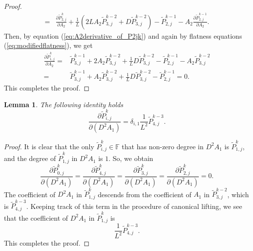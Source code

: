 \documentclass[12pt]{amsart}
\newtheorem{lem}[prop]{Lemma}
\numberwithin{equation}{section}
\begin{document}
\begin{proof}
\begin{equation}
\begin{aligned}
=&\frac{\partial \widetilde{P}_{2,j}^k}{\partial A_2}+\frac{1}{L}\left(2LA_2\widetilde{P}_{3,j}^{k-2}+D\widetilde{P}_{3,j}^{k-2}\right)-\widetilde{P}_{2,j}^{k-1}-A_2\frac{\partial \widetilde{P}_{2,j}^{k-1}}{\partial A_2}.
\end{aligned}
\end{equation}
Then, by equation (\ref{eq:A2derivative_of_P2jk}) and again by flatness equations (\ref{eq:modifiedflatness}), we get
\begin{equation}
\begin{aligned}
\frac{\partial \widetilde{P}_{1,j}^k}{\partial A_2}
=&\widetilde{P}_{3,j}^{k-1}+2A_2\widetilde{P}_{3,j}^{k-2}+\frac{1}{L}D\widetilde{P}_{3,j}^{k-2}-\widetilde{P}_{2,j}^{k-1}-A_2\widetilde{P}_{3,j}^{k-2}\\
=&\widetilde{P}_{3,j}^{k-1}+A_2\widetilde{P}_{3,j}^{k-2}+\frac{1}{L}D\widetilde{P}_{3,j}^{k-2}-\widetilde{P}_{2,j}^{k-1}=0.
\end{aligned}
\end{equation}
This completes the proof.
\end{proof}
 
\begin{lem}\label{lem:derivativeof_Pijk_wrtDA1}
The following identity holds
\begin{equation*}
\frac{\partial\widetilde{P}_{i,j}^k}{\partial{(D^2A_1)}}=\delta_{i,1}\frac{1}{L^2}\widetilde{P}_{{4},j}^{k-3}.
\end{equation*}
\end{lem}
\begin{proof}
It is clear that the only $\widetilde{P}_{i,j}^k\in\mathbb{F}$ that has non-zero degree in $D^2A_1$ is $\widetilde{P}_{1,j}^k$, and the degree of $\widetilde{P}_{1,j}^k$ in $D^2A_1$ is $1$. So, we obtain
\begin{equation}
\frac{\partial\widetilde{P}_{0,j}^k}{\partial{(D^2A_1)}}=\frac{\partial\widetilde{P}_{4,j}^k}{\partial{(D^2A_1)}}=\frac{\partial\widetilde{P}_{3,j}^k}{\partial{(D^2A_1)}}=\frac{\partial\widetilde{P}_{2,j}^k}{\partial{(D^2A_1)}}=0.
\end{equation}
The coefficient of $D^2A_1$ in $\widetilde{P}_{1,j}^k$ descends from the coefficient of $A_1$ in $\widetilde{P}_{3,j}^{k-2}$, which is $\widetilde{P}_{4,j}^{k-3}$. Keeping track of this term in the procedure of canonical lifting, we see that the coefficient of $D^2A_1$ in $\widetilde{P}_{1,j}^k$ is
\begin{equation*}
\frac{1}{L^2}\widetilde{P}_{{4},j}^{k-3}.
\end{equation*}
This completes the proof.
\end{proof}
\end{document}
